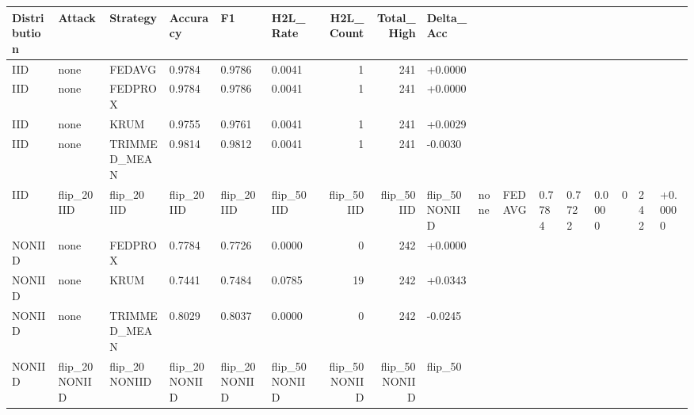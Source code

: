 \begin{tabular}{llllllrrl}
\toprule
Distribution & Attack & Strategy & Accuracy & F1 & H2L_Rate & H2L_Count & Total_High & Delta_Acc \\
\midrule
IID & none & FEDAVG & 0.9784 & 0.9786 & 0.0041 & 1 & 241 & +0.0000 \\
IID & none & FEDPROX & 0.9784 & 0.9786 & 0.0041 & 1 & 241 & +0.0000 \\
IID & none & KRUM & 0.9755 & 0.9761 & 0.0041 & 1 & 241 & +0.0029 \\
IID & none & TRIMMED_MEAN & 0.9814 & 0.9812 & 0.0041 & 1 & 241 & -0.0030 \\
IID & flip_20%
IID & flip_20%
IID & flip_20%
IID & flip_20%
IID & flip_50%
IID & flip_50%
IID & flip_50%
IID & flip_50%
NONIID & none & FEDAVG & 0.7784 & 0.7722 & 0.0000 & 0 & 242 & +0.0000 \\
NONIID & none & FEDPROX & 0.7784 & 0.7726 & 0.0000 & 0 & 242 & +0.0000 \\
NONIID & none & KRUM & 0.7441 & 0.7484 & 0.0785 & 19 & 242 & +0.0343 \\
NONIID & none & TRIMMED_MEAN & 0.8029 & 0.8037 & 0.0000 & 0 & 242 & -0.0245 \\
NONIID & flip_20%
NONIID & flip_20%
NONIID & flip_20%
NONIID & flip_20%
NONIID & flip_50%
NONIID & flip_50%
NONIID & flip_50%
NONIID & flip_50%
\bottomrule
\end{tabular}
